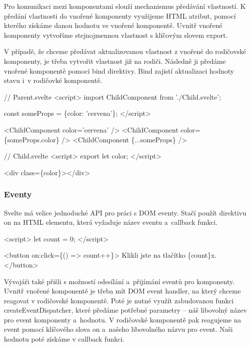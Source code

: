 Pro komunikaci mezi komponentami slouží mechanismus předávání vlastností. 
K předání vlastnosti do vnořené komponenty využijeme HTML atribut, pomocí kterého získáme danou hodnotu ve vnořené komponentě.  
Uvnitř vnořené komponenty vytvoříme stejnojmennou vlastnost s klíčovým slovem export.

V případě, že chceme předávat aktualizovanou vlastnost z vnořené do rodičovské komponenty, je třeba vytvořit vlastnost již na rodiči. 
Následně ji předáme vnořené komponentě pomocí bind direktivy. Bind zajistí aktualizaci hodnoty stavu i~v rodičovké komponentě.\cite{svelte}

\begin{prog}
// Parent.svelte
<script>
  import ChildComponent from './Child.svelte';

  const someProps = \{color: 'cervena'\};
</script>

<ChildComponent color='cervena' />
<ChildComponent color=\{someProps.color\} />
<ChildComponent \{...someProps\} />

// Child.svelte
<script>
  export let color;
</script>

<div class=\{color\}></div>
\end{prog}

\subsubsection{Eventy} %

Svelte má velice jednoduché API pro práci s DOM eventy. Stačí použít direktivu on na HTML elementu, která vyžaduje název eventu a~callback funkci.

\begin{prog}
<script>
  let count = 0;
</script>

<button on:click=\{() => count++\}>
  Klikli jste na tlačítko \{count\}x.
</button>
\end{prog}

Vývojáři také přišli s možností odesílání a~přijímání eventů pro komponenty. 
Uvnitř vnořené komponentě je třeba mít DOM event handler, na který chceme reagovat v rodičovské komponentě. 
Poté je nutné využít zabudovanou funkci createEventDispatcher, které předáme potřebné parametry -- náš libovolný název pro event komponenty a~hodnotu. 
V rodičovské komponentě pak reagujeme na event pomocí klíčového slova on a~našeho libovolného názvu pro event. Naši hodnotu poté získáme v callback funkci.\cite{sveltehandbook,svelte}

